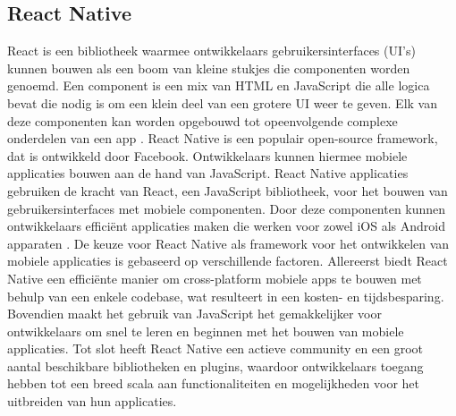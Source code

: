 \subsection{React Native}
\label{sec:react native}

React is een bibliotheek waarmee ontwikkelaars gebruikersinterfaces (UI's) kunnen bouwen als een boom van kleine stukjes die componenten worden genoemd. Een component is een mix van HTML en JavaScript die alle logica bevat die nodig is om een klein deel van een grotere UI weer te geven. Elk van deze componenten kan worden opgebouwd tot opeenvolgende complexe onderdelen van een app \autocite{Baer2018}. React Native is een populair open-source framework, dat is ontwikkeld door Facebook. Ontwikkelaars kunnen hiermee mobiele applicaties bouwen aan de hand van JavaScript. React Native applicaties gebruiken de kracht van React, een JavaScript bibliotheek, voor het bouwen van gebruikersinterfaces met mobiele componenten. Door deze componenten kunnen ontwikkelaars efficiënt applicaties maken die werken voor zowel iOS als Android apparaten \autocite{Vinnik2021}. De keuze voor React Native als framework voor het ontwikkelen van mobiele applicaties is gebaseerd op verschillende factoren. Allereerst biedt React Native een efficiënte manier om cross-platform mobiele apps te bouwen met behulp van een enkele codebase, wat resulteert in een kosten- en tijdsbesparing. Bovendien maakt het gebruik van JavaScript het gemakkelijker voor ontwikkelaars om snel te leren en beginnen met het bouwen van mobiele applicaties. Tot slot heeft React Native een actieve community en een groot aantal beschikbare bibliotheken en plugins, waardoor ontwikkelaars toegang hebben tot een breed scala aan functionaliteiten en mogelijkheden voor het uitbreiden van hun applicaties.


